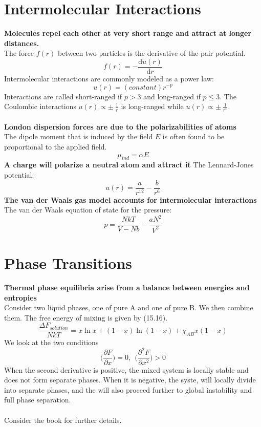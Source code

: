 \documentclass[8pt]{article}
\numberwithin{equation}{section}
\begin{document}
\begin{multicols}{2}
\section{Intermolecular Interactions}
\textbf{Molecules repel each other at very short range and attract at longer distances.}\\ 
The force $f(r)$ between two particles is the derivative of the pair potential. 
\begin{equation}
f(r)=-\frac{\mathrm{d}u(r)}{\mathrm{d}r} \tag{24.1}
\end{equation}
Intermolecular interactions are commonly modeled as a power law: 
\begin{equation}
u(r)=(constant)r^{-p} \tag{24.2} 
\end{equation}
Interactions are called short-ranged if $p>3$ and long-ranged if $p\leq 3$. 
The Coulombic interactions $u(r)\propto \pm\ \frac{1}{r}$ is long-ranged while $u(r)\propto\pm \ \frac{1}{r^{6}}$. 
\\
\\
\textbf{London dispersion forces are due to the polarizabilities of atoms} \\
The dipole moment that is induced by the field $E$ is often found to be proportional to the applied field. 
\begin{equation}
\mu_{ind}=\alpha E \tag{24.9}
\end{equation}
\textbf{A charge will polarize a neutral atom and attract it}
The Lennard-Jones potential: 
\begin{equation}
u(r)=\frac{a}{r^{12}}-\frac{b}{r^{6}} 
\end{equation}
\textbf{The van der Waals gas model accounts for intermolecular interactions} \\
The van der Waals equation of state for the pressure: 
\begin{equation}
p=\frac{NkT}{V-Nb}-\frac{aN^{2}}{V^{2}} \tag{24.15}
\end{equation}
\section{Phase Transitions}
\textbf{Thermal phase equilibria arise from a balance between energies and entropies } \\
Consider two liquid phases, one of pure A and one of pure B. We then combine them. The free energy of mixing is given by (15.16).
\begin{equation}
\frac{\Delta F_{solution}}{NkT}=x\ln{x}+(1-x)\ln{(1-x)}+\chi_{AB}x(1-x) \tag{.}
\end{equation}
We look at the two conditions  
\begin{equation}
\bigg(\frac{\partial F}{\partial x} \bigg)=0, \ \ \bigg(\frac{\partial^{2} F}{\partial x^{2}} \bigg)>0 
\end{equation}
When the second derivative is positive, the mixed system is locally stable and does not form separate phases. When it is negative, the syste, will locally divide into separate phases, and the will also proceed further to global instability and full phase separation.  \\\\ Consider the book for further details. 
\setcounter{section}{26}

\end{multicols}
\end{document}
